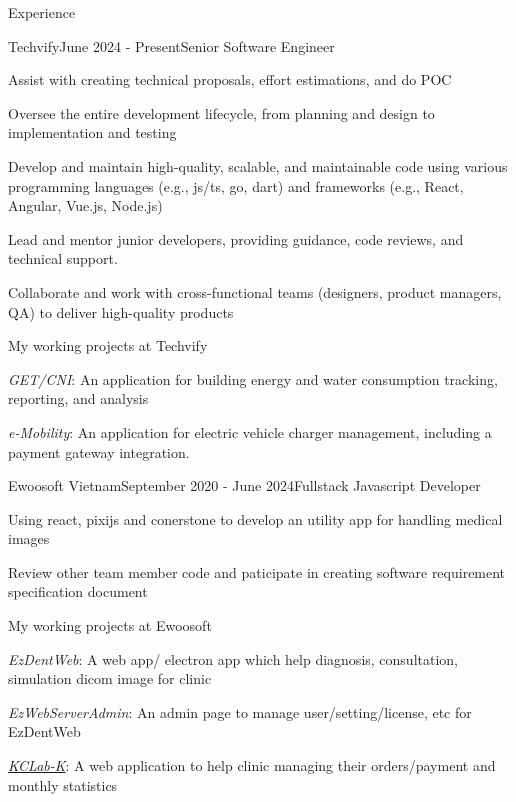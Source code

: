 \documentclass{resume}
\begin{document}
  \begin{rSection}{Experience}
    \begin{rSubsection}{Techvify}{June 2024 - Present}{Senior Software Engineer}{}
      \item Assist with creating technical proposals, effort estimations, and do POC
      \item Oversee the entire development lifecycle, from planning and design to implementation and testing
      \item Develop and maintain high-quality, scalable, and maintainable code using various programming languages (e.g., js/ts, go, dart) and frameworks (e.g., React, Angular, Vue.js, Node.js)
      \item Lead and mentor junior developers, providing guidance, code reviews, and technical support.
      \item Collaborate and work with cross-functional teams (designers, product managers, QA) to deliver high-quality products
    \end{rSubsection}

    \vspace{-0.5cm}\begin{rSubsection}{}{}{My working projects at Techvify}{}
      \item {\emph{GET/CNI}}: An application for building energy and water consumption tracking, reporting, and analysis
      \item {\emph{e-Mobility}}: An application for electric vehicle charger management, including a payment gateway integration.
    \end{rSubsection}

    \newpage

    \begin{rSubsection}{Ewoosoft Vietnam}{September 2020 - June 2024}{Fullstack Javascript Developer}{}
      \item Using react, pixijs and conerstone to develop an utility app for handling medical images
      \item Review other team member code and paticipate in creating software requirement specification document 
    \end{rSubsection}

    \vspace{-0.5cm}\begin{rSubsection}{}{}{My working projects at Ewoosoft}{}
      \item {\emph{EzDentWeb}}: A web app/ electron app which help diagnosis, consultation, simulation dicom image for clinic
      \item {\emph{EzWebServerAdmin}}: An admin page to manage user/setting/license, etc for EzDentWeb
      \item \href{https://intro.kr.dentalcleverlab.com/}{\emph{KCLab-K}}: A web application to help clinic managing their orders/payment and monthly statistics
    \end{rSubsection}


\end{rSection}
\end{document}
